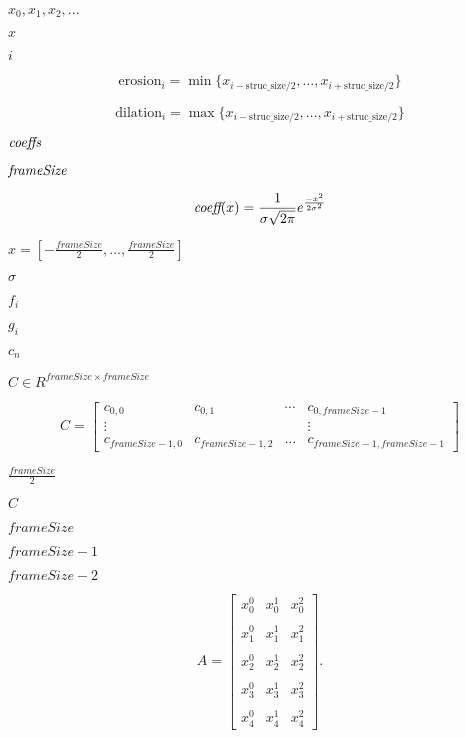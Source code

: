 \documentclass{article}
\begin{document}
$x_0, x_1, x_2, ...$
\pagebreak

$x$
\pagebreak

$ i $
\pagebreak

\[ \mathrm{erosion}_i = \min\{x_{i-\mathrm{struc\_size}/2}, \ldots, x_{i+\mathrm{struc\_size}/2}\} \]
\pagebreak

\[ \mathrm{dilation}_i = \max\{x_{i-\mathrm{struc\_size}/2}, \ldots, x_{i+\mathrm{struc\_size}/2}\} \]
\pagebreak

$ \emph{coeffs} $
\pagebreak

$ \emph{frameSize} $
\pagebreak

\[ \emph{coeff}(x) = \frac{1}{\sigma \sqrt{2\pi}} e^{\frac{-x^2}{2\sigma^2}} \]
\pagebreak

$ x=[-\frac{frameSize}{2},...,\frac{frameSize}{2}] $
\pagebreak

$ \sigma $
\pagebreak

$ f_i $
\pagebreak

$g_i$
\pagebreak

$ c_n $
\pagebreak

$C \in R^{frameSize \times frameSize}$
\pagebreak

\[ C= \left[ \begin{array}{cccc} c_{0,0} & c_{0,1} & \cdots & c_{0,frameSize-1} \\ \vdots & & & \vdots \\ c_{frameSize-1,0} & c_{frameSize-1,2} & \ldots & c_{frameSize-1,frameSize-1} \end{array} \right]\]
\pagebreak

$ \frac{frameSize}{2} $
\pagebreak

$ C $
\pagebreak

$ frameSize $
\pagebreak

$ frameSize-1 $
\pagebreak

$ frameSize-2 $
\pagebreak

\[ A=\left[ \begin{array}{ccc} x_0^0 & x_0^1 & x_0^2 \\ \\ x_1^0 & x_1^1 & x_1^2 \\ \\ x_2^0 & x_2^1 & x_2^2 \\ \\ x_3^0 & x_3^1 & x_3^2 \\ \\ x_4^0 & x_4^1 & x_4^2 \end{array} \right]. \]
\pagebreak
\end{document}
